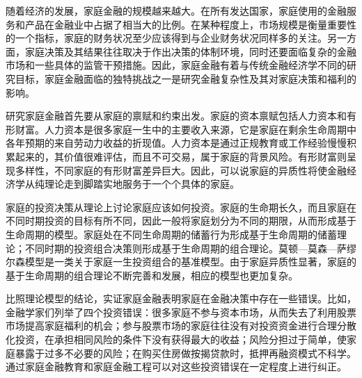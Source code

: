 

\begin{tcolorbox}[summary,title=本章小结]
随着经济的发展，家庭金融的规模越来越大。在所有发达国家，家庭使用的金融服务和产品在金融业中占据了相当大的比例。在某种程度上，市场规模是衡量重要性的一个指标，家庭的财务状况至少应该得到与企业财务状况同样多的关注。另一方面，家庭决策及其结果往往取决于作出决策的体制环境，同时还要面临复杂的金融市场和一些具体的监管干预措施。因此，家庭金融有着与传统金融经济学不同的研究目标，家庭金融面临的独特挑战之一是研究金融复杂性及其对家庭决策和福利的影响。

研究家庭金融首先要从家庭的禀赋和约束出发。家庭的资本禀赋包括人力资本和有形财富。人力资本是很多家庭一生中的主要收入来源，它是家庭在剩余生命周期中各年预期的来自劳动力收益的折现值。人力资本是通过正规教育或工作经验慢慢积累起来的，其价值很难评估，而且不可交易，属于家庭的背景风险。有形财富则呈现多样性，不同家庭的有形财富差异巨大。因此，可以说家庭的异质性将使金融经济学从纯理论走到脚踏实地服务于一个个具体的家庭。

家庭的投资决策从理论上讨论家庭应该如何投资。家庭的生命期长久，而且家庭在不同时期投资的目标有所不同，因此一般将家庭划分为不同的期限，从而形成基于生命周期的模型。家庭处在不同生命周期的储蓄行为形成基于生命周期的储蓄理论；不同时期的投资组合决策则形成基于生命周期的组合理论。莫顿—莫森—萨缪尔森模型是一类关于家庭一生投资组合的基准模型。由于家庭异质性显著，家庭的基于生命周期的组合理论不断完善和发展，相应的模型也更加复杂。

比照理论模型的结论，实证家庭金融表明家庭在金融决策中存在一些错误。比如，金融学家们列举了四个投资错误：很多家庭不参与资本市场，从而失去了利用股票市场提高家庭福利的机会；参与股票市场的家庭往往没有对投资资金进行合理分散化投资，在承担相同风险的条件下没有获得最大的收益；风险分担过于简单，使家庭暴露于过多不必要的风险；在购买住房做按揭贷款时，抵押再融资模式不科学。通过家庭金融教育和家庭金融工程可以对这些投资错误在一定程度上进行纠正。
\end{tcolorbox}



